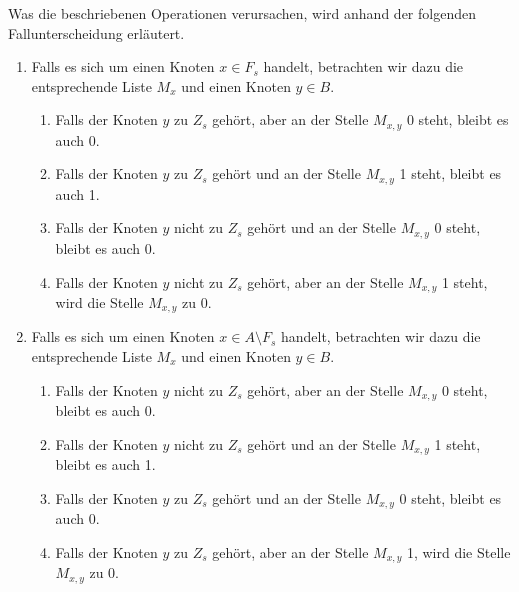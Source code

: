 Was die beschriebenen Operationen verursachen, wird anhand der folgenden Fallunterscheidung erläutert.
\begin{enumerate}
  \item Falls es sich um einen Knoten $x \in F_s$ handelt, betrachten wir dazu die entsprechende
  Liste $M_x$ und einen Knoten $y \in B$.
  \begin{enumerate}
   \item Falls der Knoten $y$ zu $Z_s$ gehört, aber an der Stelle $M_{x,y}$ 0 steht, bleibt es auch 0.
   \item Falls der Knoten $y$ zu $Z_s$ gehört und an der Stelle $M_{x,y}$ 1 steht, bleibt es auch 1.
   \item Falls der Knoten $y$ nicht zu $Z_s$ gehört und an der Stelle $M_{x,y}$ 0 steht, bleibt es auch 0.
   \item Falls der Knoten $y$ nicht zu $Z_s$  gehört, aber an der Stelle $M_{x,y}$ 1 steht, 
    wird die Stelle $M_{x,y}$ zu 0.
  \end{enumerate}
  \item Falls es sich um einen Knoten $x \in A \setminus F_s$ handelt, betrachten wir dazu die entsprechende
  Liste $M_x$ und einen Knoten $y \in B$.
  \begin{enumerate}
    \item Falls der Knoten $y$ nicht zu $Z_s$ gehört, aber an der Stelle $M_{x,y}$ 0 steht, bleibt es auch 0.
    \item Falls der Knoten $y$ nicht zu $Z_s$ gehört und an der Stelle $M_{x,y}$ 1 steht, bleibt es auch 1.
    \item Falls der Knoten $y$ zu $Z_s$ gehört und an der Stelle $M_{x,y}$ 0 steht, bleibt es auch 0.
    \item Falls der Knoten $y$ zu $Z_s$ gehört, aber an der Stelle $M_{x,y}$ 1, 
      wird die Stelle $M_{x,y}$ zu 0.
  \end{enumerate}
\end{enumerate}



